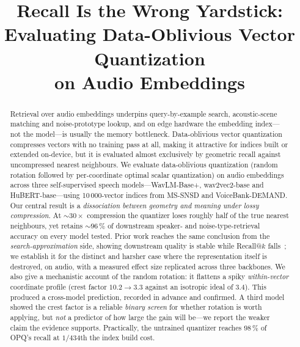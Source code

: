 \documentclass[conference]{IEEEtran}
\begin{document}
\title{Recall Is the Wrong Yardstick:\\Evaluating Data-Oblivious Vector Quantization\\on Audio Embeddings}

\author{
}

\maketitle

\begin{abstract}
Retrieval over audio embeddings underpins query-by-example search, acoustic-scene matching and
noise-prototype lookup, and on edge hardware the embedding index---not the model---is usually the
memory bottleneck. Data-oblivious vector quantization compresses vectors with no training pass at
all, making it attractive for indices built or extended on-device, but it is evaluated almost
exclusively by geometric recall against uncompressed nearest neighbours.
We evaluate data-oblivious quantization (random rotation followed by per-coordinate optimal scalar
quantization) on audio embeddings across three self-supervised speech models---WavLM-Base+,
wav2vec2-base and HuBERT-base---using 10\,000-vector indices from MS-SNSD and VoiceBank-DEMAND.
Our central result is a \emph{dissociation between geometry and meaning under lossy compression}.
At ${\sim}30\times$ compression the quantizer loses roughly half of the true nearest neighbours,
yet retains ${\sim}96\,\%$ of downstream speaker- and noise-type-retrieval accuracy on every model
tested. Prior work reaches the same conclusion from the \emph{search-approximation} side, showing
downstream quality is stable while Recall@$k$ falls~\cite{dimitropoulos2026}; we establish it for
the distinct and harsher case where the representation itself is destroyed, on audio, with a
measured effect size replicated across three backbones.
We also give a mechanistic account of the random rotation: it flattens a spiky \emph{within-vector}
coordinate profile (crest factor $10.2 \rightarrow 3.3$ against an isotropic ideal of $3.4$). This
produced a cross-model prediction, recorded in advance and confirmed. A third model showed the
crest factor is a reliable \emph{binary screen} for whether rotation is worth applying, but
\emph{not} a predictor of how large the gain will be---we report the weaker claim the evidence
supports. Practically, the untrained quantizer reaches $98\,\%$ of OPQ's recall at $1/434$th the
index build cost.
\end{abstract}
\end{document}
